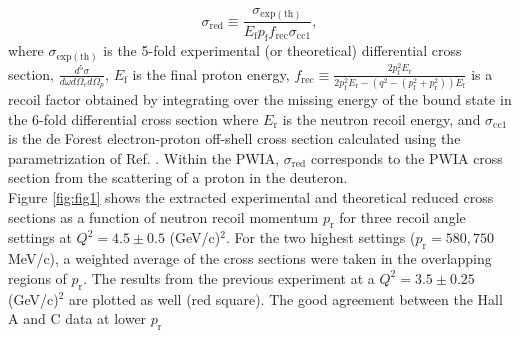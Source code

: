 {%
}
\DIFdelend \begin{equation}
\sigma_{\mathrm{red}} \equiv \frac{\sigma_{\mathrm{exp(th)}}}{E_{\mathrm{f}}p_{\mathrm{f}}f_{\mathrm{rec}}\sigma_{\mathrm{cc1}}},
\label{eq:1}
\end{equation}
\noindent where $\sigma_{\mathrm{exp(th)}}$ is the 5-fold experimental (or theoretical) differential cross section, $\frac{d^{5}\sigma}{d\omega d\Omega_{e} d\Omega_{p}}$,
$E_{\mathrm{f}}$ is the final proton energy, $f_{\mathrm{rec}}\equiv \frac{2p_{\mathrm{f}}^{2}E_{\mathrm{r}}}{2p_{\mathrm{f}}^{2}E_{\mathrm{r}} - (q^{2} - (p_{\mathrm{f}}^{2} + p_{\mathrm{r}}^{2}))E_{\mathrm{f}}}$
is a recoil factor obtained by integrating over the missing energy of the bound state in the 6-fold differential cross section where $E_{\mathrm{r}}$ is the neutron recoil energy, and $\sigma_{\mathrm{cc1}}$ is the
de Forest \cite{DEFOREST1983} electron-proton off-shell cross section calculated using the \DIFdelbegin {}\DIFdelend \DIFaddbegin {}\DIFaddend parametrization of Ref. \cite{PhysRevC.69.022201}.
Within the PWIA, $\sigma_{\mathrm{red}}$ corresponds to the PWIA cross section from the scattering of a proton in the deuteron. \\
\indent Figure \ref{fig:fig1} shows the extracted experimental and theoretical reduced cross sections as a function of neutron recoil momentum
$p_{\mathrm{r}}$ for three recoil angle settings at $Q^{2}=4.5\pm0.5$ (GeV/c)$^{2}$. For the two highest \DIFaddbegin {}\DIFaddend settings ($p_{\mathrm{r}}=580, 750$ MeV/c), a weighted average of the cross sections were taken in the overlapping regions of $p_{\mathrm{r}}$. The results from the previous experiment \cite{PhysRevLett.107.262501} at a $Q^{2}=3.5\pm0.25$ (GeV/c)$^{2}$ are plotted as well (red square). The good agreement between the Hall A and C data at lower $p_{\mathrm{r}}$
